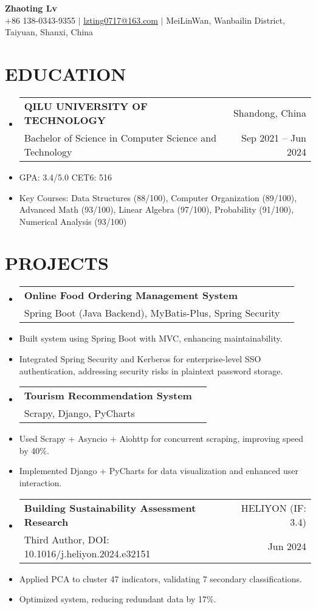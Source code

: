 \documentclass[a4paper,11pt]{article}
\makeatletter
\newenvironment{resumeList}{\begin{itemize}[leftmargin=*,label={}]}{\end{itemize}}
\newcommand{\resumeItem}[1]{\item\small{#1}}
\newcommand{\resumeEntry}[4]{
  \item \begin{tabular*}{0.97\textwidth}{l@{\extracolsep{\fill}}r}
    \textbf{#1} & #2 \\
    #3 & #4 \\
  \end{tabular*}
}
\makeatother
\begin{document}
\begin{center}
    {\Huge\bfseries Zhaoting Lv} \\ \vspace{3pt}
    \small
    \faMobile \hspace{.5pt} +86 138-0343-9355 $|$ 
    \faAt \hspace{.5pt} \href{mailto:lvzting0717@163.com}{lzting0717@163.com} $|$ 
    \faMapMarker \hspace{.5pt} MeiLinWan, Wanbailin District, Taiyuan, Shanxi, China 
\end{center}

\section{EDUCATION}
\begin{resumeList}
    \resumeEntry{QILU UNIVERSITY OF TECHNOLOGY}
    {Shandong, China}
    {Bachelor of Science in Computer Science and Technology}
    {Sep 2021 -- Jun 2024}
    
    \resumeItem{GPA: 3.4/5.0 \qquad CET6: 516} 
    \resumeItem{Key Courses: Data Structures (88/100), Computer Organization (89/100), Advanced Math (93/100), Linear Algebra (97/100), Probability (91/100), Numerical Analysis (93/100)}
\end{resumeList}

\section{PROJECTS}
\begin{resumeList}
    \resumeEntry{Online Food Ordering Management System}
    {}
    {Spring Boot (Java Backend), MyBatis-Plus, Spring Security}
    {}

    \resumeItem{Built system using Spring Boot with MVC, enhancing maintainability.}
    \resumeItem{Integrated Spring Security and Kerberos for enterprise-level SSO authentication, addressing security risks in plaintext password storage.}

    \resumeEntry{Tourism Recommendation System}
    {}
    {Scrapy, Django, PyCharts}
    {}

    \resumeItem{Used Scrapy + Asyncio + Aiohttp for concurrent scraping, improving speed by 40\%.}
    \resumeItem{Implemented Django + PyCharts for data visualization and enhanced user interaction.}

    \resumeEntry{Building Sustainability Assessment Research}
    {HELIYON (IF: 3.4)}
    {Third Author, DOI: 10.1016/j.heliyon.2024.e32151}
    {Jun 2024}

    \resumeItem{Applied PCA to cluster 47 indicators, validating 7 secondary classifications.}
    \resumeItem{Optimized system, reducing redundant data by 17\%.}
\end{resumeList}
\end{document}
